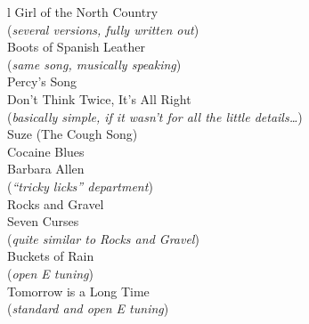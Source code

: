 \begin{articlelayout}
\begin{ctabular}{l}
Girl of the North Country \\
\hspace{2em} (\textit{several versions, fully written out}) \\
Boots of Spanish Leather \\
\hspace{2em} (\textit{same song, musically speaking}) \\
Percy's Song \\
Don't Think Twice, It's All Right \\
\hspace{2em} (\textit{basically simple, if it wasn't for all the little details\ldots}) \\
Suze (The Cough Song) \\
Cocaine Blues \\
Barbara Allen \\
\hspace{2em} (\textit{``tricky licks'' department}) \\
Rocks and Gravel \\
Seven Curses \\
\hspace{2em} (\textit{quite similar to \textnormal{Rocks and Gravel}}) \\
Buckets of Rain \\
\hspace{2em} (\textit{open E tuning}) \\
Tomorrow is a Long Time \\
\hspace{2em} (\textit{standard and open E tuning})
\end{ctabular}

\end{articlelayout}
